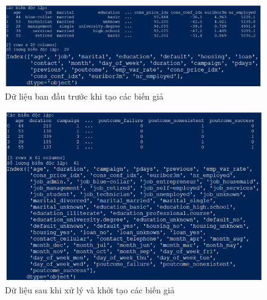 \documentclass{report}
\newcommand\tab[1][1.25cm]{\hspace*{#1}}
\begin{document}
\begin{enumerate}
                    \begin{figure}[htp]
                        \centering
                        \tab[1.25cm]\includegraphics[scale = 0.96]{image/VC_2.png}
                        \caption{Dữ liệu ban đầu trước khi tạo các biến giả}
                    \end{figure}
                    
                    \begin{figure}[htp]
                        \centering
                        \tab[1.25cm]\includegraphics[scale = 0.96]{image/VC_3.png}
                        \caption{Dữ liệu sau khi xử lý và khởi tạo các biến giả}
                    \end{figure}
                \end{enumerate}
            
    \pagebreak
\end{document}
